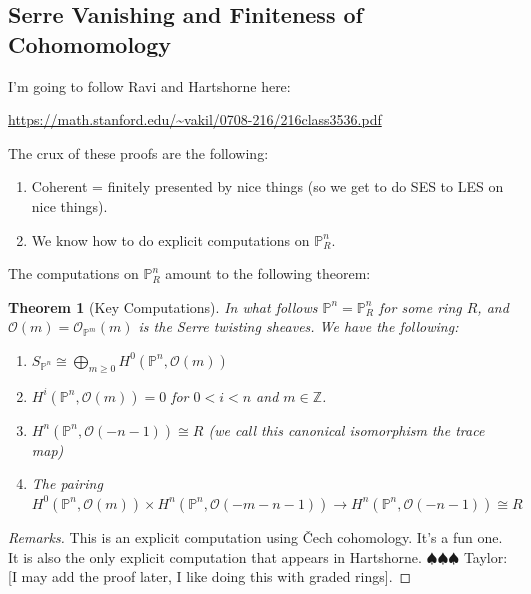 \documentclass[12pt]{article}
\numberwithin{equation}{section}
\newtheorem{theorem}{Theorem}[subsection]
\theoremstyle{definition}
\theoremstyle{remark}
\newcommand{\ZZ}{\mathbb{Z}}
\newcommand{\Ocal}{\mathcal{O}}
\newcommand{\PP}{\mathbb{P}}
\newcommand{\taylor}[1]{{\color{blue} \sf $\spadesuit\spadesuit\spadesuit$ Taylor: [#1]}}
\begin{document}
\subsection{Serre Vanishing and Finiteness of Cohomomology}
I'm going to follow Ravi and Hartshorne here:
\begin{center}
	\url{https://math.stanford.edu/~vakil/0708-216/216class3536.pdf}
\end{center}
The crux of these proofs are the following:
\begin{enumerate}
	\item Coherent = finitely presented by nice things (so we get to do SES to LES on nice things).
	\item We know how to do explicit computations on $\PP^n_R$.
\end{enumerate}
The computations on $\PP^n_R$ amount to the following theorem:

\begin{theorem}[Key Computations]\label{thm:cohomology-of-projective-space}
	In what follows $\PP^n=\PP^n_R$ for some ring $R$, and $\Ocal(m) = \Ocal_{\PP^m}(m)$ is the Serre twisting sheaves. 
	We have the following:
	\begin{enumerate}
		\item $S_{\PP^n} \cong \bigoplus_{m\geq 0} H^0(\PP^n, \Ocal(m))$
		\item $H^i(\PP^n,\Ocal(m))=0$ for $0<i<n$ and $m\in \ZZ$.
		\item $H^n(\PP^n,\Ocal(-n-1))\cong R$ (we call this canonical isomorphism the trace map)
		\item The pairing $H^0(\PP^n,\Ocal(m))\times H^n(\PP^n,\Ocal(-m-n-1)) \to H^n(\PP^n,\Ocal(-n-1)) \cong R$
	\end{enumerate}
\end{theorem}
\begin{proof}[Remarks]
	This is an explicit computation using \v{C}ech cohomology. 
	It's a fun one. 
	It is also the only explicit computation that appears in Hartshorne. 
	\taylor{I may add the proof later, I like doing this with graded rings}.
\end{proof}
\end{document}
